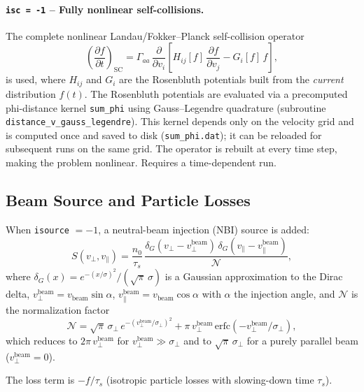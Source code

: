 \documentclass[11pt,a4paper]{article}
\newcommand{\vp}{v_\perp}
\newcommand{\vpa}{v_\parallel}
\begin{document}
\paragraph{\texttt{isc = -1} -- Fully nonlinear self-collisions.}
The complete nonlinear Landau/Fokker--Planck self-collision operator
\begin{equation}
  \left(\frac{\partial f}{\partial t}\right)_{\mathrm{SC}}
  = \Gamma_{aa}\,\frac{\partial}{\partial v_i}
    \left[ H_{ij}[f]\,\frac{\partial f}{\partial v_j}
         - G_i[f]\,f \right],
\end{equation}
is used, where $H_{ij}$ and $G_i$ are the Rosenbluth potentials built from
the \emph{current} distribution $f(t)$.  The Rosenbluth potentials are
evaluated via a precomputed phi-distance kernel \texttt{sum\_phi} using
Gauss--Legendre quadrature (subroutine \texttt{distance\_v\_gauss\_legendre}).
This kernel depends only on the velocity grid and is computed once and saved
to disk (\texttt{sum\_phi.dat}); it can be reloaded for subsequent runs on the
same grid.  The operator is rebuilt at every time step, making the problem
nonlinear.  Requires a time-dependent run.

\subsection{Beam Source and Particle Losses}\label{sec:beam}

When \texttt{isource} $= -1$, a neutral-beam injection (NBI) source is added:
\begin{equation}
  S(\vp,\vpa) = \frac{n_0}{\tau_s}\,
    \frac{\delta_G(\vp - \vp^\mathrm{beam})\,\delta_G(\vpa - \vpa^\mathrm{beam})}
         {\mathcal{N}},
\end{equation}
where $\delta_G(x) = e^{-(x/\sigma)^2}/(\sqrt{\pi}\,\sigma)$ is a Gaussian
approximation to the Dirac delta, $\vp^\mathrm{beam} = v_\mathrm{beam}\sin\alpha$,
$\vpa^\mathrm{beam} = v_\mathrm{beam}\cos\alpha$ with $\alpha$ the injection
angle, and $\mathcal{N}$ is the normalization factor
\begin{equation}
  \mathcal{N} = \sqrt{\pi}\,\sigma_\perp\,e^{-(\vp^\mathrm{beam}/\sigma_\perp)^2}
               + \pi\,\vp^\mathrm{beam}\,\mathrm{erfc}(-\vp^\mathrm{beam}/\sigma_\perp),
\end{equation}
which reduces to $2\pi\,\vp^\mathrm{beam}$ for $\vp^\mathrm{beam} \gg \sigma_\perp$
and to $\sqrt{\pi}\,\sigma_\perp$ for a purely parallel beam ($\vp^\mathrm{beam}=0$).

The loss term is $-f/\tau_s$ (isotropic particle losses with slowing-down time $\tau_s$).
\end{document}
